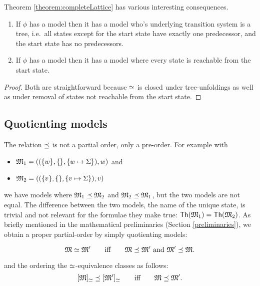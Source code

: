 Theorem \ref{theorem:completeLattice} has various interesting
consequences.

\begin{corollary}
\begin{enumerate}

\item If $\phi$ has a model then it has a model who's underlying
  transition system is a tree, i.e.~all states except for the start state
  have exactly one predecessor, and the start state has no predecessors.

\item If $\phi$ has a model then it has a model where every state is
  reachable from the start state.

\end{enumerate}
\end{corollary}
\begin{proof}
Both are straightforward because $\simeq$ is closed under
tree-unfoldings as well as under removal of states not reachable from
the start state.
\end{proof}


\subsection{Quotienting models}

\NI The relation $\preceq$ is not a partial order, only a
pre-order. For example with
\begin{itemize}

\item $\frak{M}_1 = ( (\{w\}, \{\}, \{w \mapsto \Sigma\}), w)$ and
\item $\frak{M}_2 = ( (\{v\}, \{\}, \{v \mapsto \Sigma\}), v)$ 

\end{itemize}

\NI we have models where $\frak{M}_1 \preceq \frak{M}_2$ and $\frak{M}_2
\preceq \frak{M}_1$, but the two models are not equal. The difference
between the two models, the name of the unique state, is trivial and
not relevant for the formulae they make true: $\mathsf{Th}(\frak{M}_1)
= \mathsf{Th}(\frak{M}_2)$.  As briefly mentioned in the mathematical
preliminaries (Section \ref{preliminaries}), we obtain a proper
partial-order by simply quotienting models:

\[
   \frak{M} \simeq \frak{M}'
      \qquad\text{iff}\qquad
   \frak{M} \preceq \frak{M}' \ \text{and}\ \frak{M}' \preceq \frak{M}.
\]

\NI and the ordering the $\simeq$-equivalence classes as follows:
\[
    [\frak{M}]_{\simeq} \preceq [\frak{M}']_{\simeq}
      \qquad\text{iff}\qquad
    \frak{M} \preceq \frak{M}'.
\]

